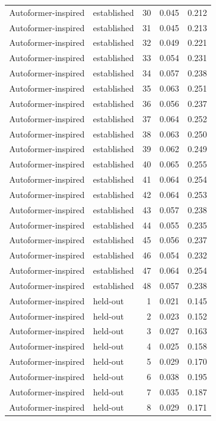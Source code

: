 \begin{tabular}{llrrr}
Autoformer-inspired & established & 30 & 0.045 & 0.212 \\
Autoformer-inspired & established & 31 & 0.045 & 0.213 \\
Autoformer-inspired & established & 32 & 0.049 & 0.221 \\
Autoformer-inspired & established & 33 & 0.054 & 0.231 \\
Autoformer-inspired & established & 34 & 0.057 & 0.238 \\
Autoformer-inspired & established & 35 & 0.063 & 0.251 \\
Autoformer-inspired & established & 36 & 0.056 & 0.237 \\
Autoformer-inspired & established & 37 & 0.064 & 0.252 \\
Autoformer-inspired & established & 38 & 0.063 & 0.250 \\
Autoformer-inspired & established & 39 & 0.062 & 0.249 \\
Autoformer-inspired & established & 40 & 0.065 & 0.255 \\
Autoformer-inspired & established & 41 & 0.064 & 0.254 \\
Autoformer-inspired & established & 42 & 0.064 & 0.253 \\
Autoformer-inspired & established & 43 & 0.057 & 0.238 \\
Autoformer-inspired & established & 44 & 0.055 & 0.235 \\
Autoformer-inspired & established & 45 & 0.056 & 0.237 \\
Autoformer-inspired & established & 46 & 0.054 & 0.232 \\
Autoformer-inspired & established & 47 & 0.064 & 0.254 \\
Autoformer-inspired & established & 48 & 0.057 & 0.238 \\
Autoformer-inspired & held-out & 1 & 0.021 & 0.145 \\
Autoformer-inspired & held-out & 2 & 0.023 & 0.152 \\
Autoformer-inspired & held-out & 3 & 0.027 & 0.163 \\
Autoformer-inspired & held-out & 4 & 0.025 & 0.158 \\
Autoformer-inspired & held-out & 5 & 0.029 & 0.170 \\
Autoformer-inspired & held-out & 6 & 0.038 & 0.195 \\
Autoformer-inspired & held-out & 7 & 0.035 & 0.187 \\
Autoformer-inspired & held-out & 8 & 0.029 & 0.171 \\

\end{tabular}
